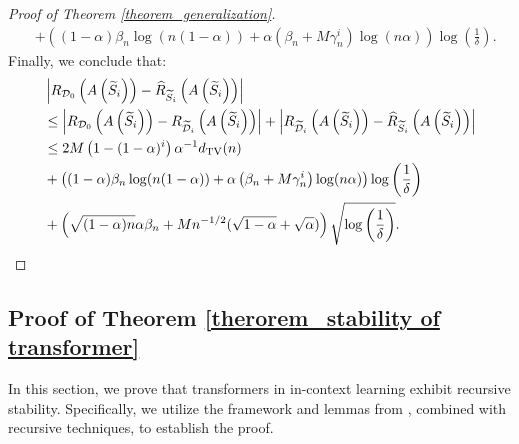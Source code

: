 \begin{proof}[Proof of Theorem \ref{theorem_generalization}]
$$\begin{aligned}
& +\left((1-\alpha) \beta_n \log (n(1-\alpha))+\alpha\left(\beta_n+M \gamma_n^i\right) \log (n \alpha)\right) \log \left(\frac{1}{\delta}\right).
\end{aligned}
$$
Finally, we conclude that:
\begin{align}
&\left|R_{\mathcal{D}_0}\left(A\left(\widetilde{S}_i\right)\right)-\widehat{R}_{\widetilde{S}_i}\left(A\left(\widetilde{S}_i\right)\right)\right|\notag\\
&\leq\left|R_{\mathcal{D}_0}\left(A\left(\widetilde{S}_i\right)\right)-R_{\widetilde{\mathcal{D}}_i}\left(A\left(\widetilde{S}_i\right)\right)\right|+\left|R_{\widetilde{\mathcal{D}}_i}\left(A\left(\widetilde{S}_i\right)\right)-\widehat{R}_{\widetilde{S}_i}\left(A\left(\widetilde{S}_i\right)\right)\right| \notag \\
&\leq2 M\left(1-(1-\alpha)^i\right) \alpha^{-1} d_{\mathrm{TV}}(n)\notag \\
&+\left((1-\alpha) \beta_n \log (n(1-\alpha))+\alpha\left(\beta_n+M \gamma_n^i\right) \log (n \alpha)\right) \log \left(\frac{1}{\delta}\right)\notag \\
&+\left(\sqrt{(1-\alpha) n} \alpha \beta_n+M n^{-1 / 2}(\sqrt{1-\alpha}+\sqrt{\alpha})\right) \sqrt{\log \left(\frac{1}{\delta}\right)}.
\end{align}
\end{proof}






























\subsection{Proof of Theorem \ref{therorem_stability of transformer}}
In this section, we prove that transformers in in-context learning exhibit recursive stability. Specifically, we utilize the framework and lemmas from \cite{li2023transformers}, combined with recursive techniques, to establish the proof.

